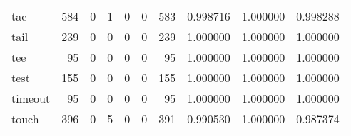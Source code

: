 \begin{tabular}{lrrrrrrrrr}
tac       &                                   584 &                                                  0 &                                                  1 &                                                  0 &                                                  0 &                                                583 &                                           0.998716 &                               1.000000 &                             0.998288 \\
tail      &                                   239 &                                                  0 &                                                  0 &                                                  0 &                                                  0 &                                                239 &                                           1.000000 &                               1.000000 &                             1.000000 \\
tee       &                                    95 &                                                  0 &                                                  0 &                                                  0 &                                                  0 &                                                 95 &                                           1.000000 &                               1.000000 &                             1.000000 \\
test      &                                   155 &                                                  0 &                                                  0 &                                                  0 &                                                  0 &                                                155 &                                           1.000000 &                               1.000000 &                             1.000000 \\
timeout   &                                    95 &                                                  0 &                                                  0 &                                                  0 &                                                  0 &                                                 95 &                                           1.000000 &                               1.000000 &                             1.000000 \\
touch     &                                   396 &                                                  0 &                                                  5 &                                                  0 &                                                  0 &                                                391 &                                           0.990530 &                               1.000000 &                             0.987374 \\

\end{tabular}
